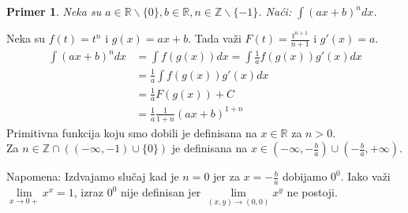 \documentclass{article}
\newtheorem{prim}{Primer}[section]
\begin{document}
\begin{primbox}
    \begin{prim}
        Neka su $a \in \mathbb{R}\backslash\{0\}, b\in\mathbb{R}, n \in \mathbb{Z}\backslash\{-1\}$. Naći: $\int(ax + b)^ndx$.
    \end{prim}
    Neka su $f(t) = t^n$ i $g(x) = ax+b$. Tada važi $F(t) = \frac{t^{n+1}}{n+1}$ i $g'(x) = a$.
    \begin{align*}
        \int(ax + b)^ndx & = \int f(g(x))dx = \int\frac{1}{a}f(g(x))g'(x)dx
        \\ & = \frac{1}{a}\int f(g(x))g'(x)dx
        \\ & = \frac{1}{a}F(g(x)) + C
        \\ & = \frac{1}{a}\frac{1}{1+n}(ax + b)^{1+n}
    \end{align*}
    Primitivna funkcija koju smo dobili je definisana na $x \in \mathbb{R}$ za $n > 0$.\\
    Za $n\in \mathbb{Z} \cap ((-\infty, -1)\cup\{0\})$ je definisana na $x \in (-\infty, -\frac{b}{a})\cup(-\frac{b}{a}, +\infty)$.\par
    Napomena: Izdvajamo slučaj kad je $n=0$ jer za $x=-\frac{b}{a}$ dobijamo $0^0$. Iako važi $\lim\limits_{x\rightarrow0+}x^x = 1$, izraz
    $0^0$ nije definisan jer $\lim\limits_{(x, y)\rightarrow(0,0)} x^y$ ne postoji.
\end{primbox}
\end{document}
